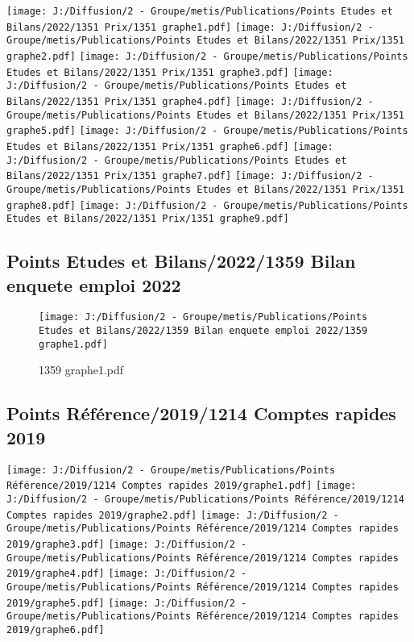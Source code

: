\documentclass[
]{article}
\begin{document}
\texttt{[image: J:/Diffusion/2 - Groupe/metis/Publications/Points Etudes et Bilans/2022/1351 Prix/1351 graphe1.pdf]}
\texttt{[image: J:/Diffusion/2 - Groupe/metis/Publications/Points Etudes et Bilans/2022/1351 Prix/1351 graphe2.pdf]}
\texttt{[image: J:/Diffusion/2 - Groupe/metis/Publications/Points Etudes et Bilans/2022/1351 Prix/1351 graphe3.pdf]}
\texttt{[image: J:/Diffusion/2 - Groupe/metis/Publications/Points Etudes et Bilans/2022/1351 Prix/1351 graphe4.pdf]}
\texttt{[image: J:/Diffusion/2 - Groupe/metis/Publications/Points Etudes et Bilans/2022/1351 Prix/1351 graphe5.pdf]}
\texttt{[image: J:/Diffusion/2 - Groupe/metis/Publications/Points Etudes et Bilans/2022/1351 Prix/1351 graphe6.pdf]}
\texttt{[image: J:/Diffusion/2 - Groupe/metis/Publications/Points Etudes et Bilans/2022/1351 Prix/1351 graphe7.pdf]}
\texttt{[image: J:/Diffusion/2 - Groupe/metis/Publications/Points Etudes et Bilans/2022/1351 Prix/1351 graphe8.pdf]}
\texttt{[image: J:/Diffusion/2 - Groupe/metis/Publications/Points Etudes et Bilans/2022/1351 Prix/1351 graphe9.pdf]}

\hypertarget{points-etudes-et-bilans20221359-bilan-enquete-emploi-2022}{%
\subsection{Points Etudes et Bilans/2022/1359 Bilan enquete emploi
2022}\label{points-etudes-et-bilans20221359-bilan-enquete-emploi-2022}}

\begin{figure}
\centering
\texttt{[image: J:/Diffusion/2 - Groupe/metis/Publications/Points Etudes et Bilans/2022/1359 Bilan enquete emploi 2022/1359 graphe1.pdf]}
\caption{1359 graphe1.pdf}
\end{figure}

\hypertarget{points-ruxe9fuxe9rence20191214-comptes-rapides-2019}{%
\subsection{Points Référence/2019/1214 Comptes rapides
2019}\label{points-ruxe9fuxe9rence20191214-comptes-rapides-2019}}

\texttt{[image: J:/Diffusion/2 - Groupe/metis/Publications/Points Référence/2019/1214 Comptes rapides 2019/graphe1.pdf]}
\texttt{[image: J:/Diffusion/2 - Groupe/metis/Publications/Points Référence/2019/1214 Comptes rapides 2019/graphe2.pdf]}
\texttt{[image: J:/Diffusion/2 - Groupe/metis/Publications/Points Référence/2019/1214 Comptes rapides 2019/graphe3.pdf]}
\texttt{[image: J:/Diffusion/2 - Groupe/metis/Publications/Points Référence/2019/1214 Comptes rapides 2019/graphe4.pdf]}
\texttt{[image: J:/Diffusion/2 - Groupe/metis/Publications/Points Référence/2019/1214 Comptes rapides 2019/graphe5.pdf]}
\texttt{[image: J:/Diffusion/2 - Groupe/metis/Publications/Points Référence/2019/1214 Comptes rapides 2019/graphe6.pdf]}
\end{document}
